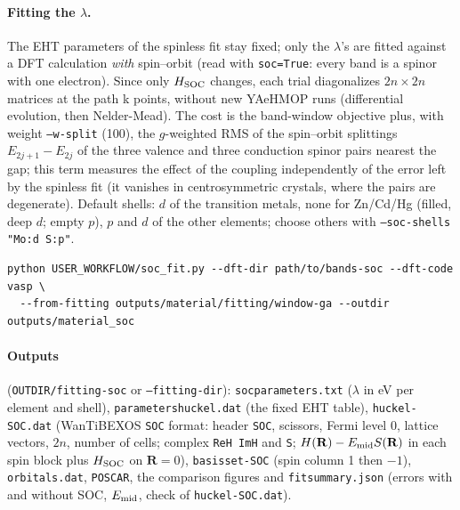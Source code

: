 \documentclass[11pt,a4paper]{article}
\newcommand{\cmd}[1]{\texttt{#1}}
\renewcommand{\_}{\origunderscore\allowbreak}
\begin{document}
\paragraph{Fitting the $\lambda$.} The EHT parameters of the spinless fit stay fixed; only the $\lambda$'s are fitted
against a DFT calculation \emph{with} spin--orbit (read with \cmd{soc=True}: every band is a spinor with one electron).
Since only $H_{\rm SOC}$ changes, each trial diagonalizes $2n\times2n$ matrices at the path k points, without new
YAeHMOP runs (differential evolution, then Nelder-Mead). The cost is the band-window objective plus, with weight
\cmd{--w-split} (100), the $g$-weighted RMS of the spin--orbit splittings $E_{2j+1}-E_{2j}$ of the three valence and three
conduction spinor pairs nearest the gap; this term measures the effect of the coupling independently of the error left by
the spinless fit (it vanishes in centrosymmetric crystals, where the pairs are degenerate). Default shells: $d$ of the
transition metals, none for Zn/Cd/Hg (filled, deep $d$; empty $p$), $p$ and $d$ of the other elements; choose others with
\cmd{--soc-shells "Mo:d S:p"}.
\begin{lstlisting}[style=sh]
python USER_WORKFLOW/soc_fit.py --dft-dir path/to/bands-soc --dft-code vasp \
  --from-fitting outputs/material/fitting/window-ga --outdir outputs/material_soc
\end{lstlisting}
\paragraph{Outputs} (\cmd{OUTDIR/fitting-soc} or \cmd{--fitting-dir}): \cmd{soc\_parameters.txt} ($\lambda$ in eV per
element and shell), \cmd{parameters\_huckel.dat} (the fixed EHT table), \cmd{huckel-SOC.dat} (WanTiBEXOS \cmd{SOC} format:
header \cmd{SOC}, scissors, Fermi level 0, lattice vectors, $2n$, number of cells; complex \cmd{ReH ImH} and \cmd{S};
$H(\mathbf R)-E_{\rm mid}S(\mathbf R)$ in each spin block plus $H_{\rm SOC}$ on $\mathbf R=0$), \cmd{basis\_set-SOC} (spin
column 1 then $-1$), \cmd{orbitals.dat}, \cmd{POSCAR}, the comparison figures and \cmd{fit\_summary.json} (errors with and
without SOC, $E_{\rm mid}$, check of \cmd{huckel-SOC.dat}).
\end{document}
